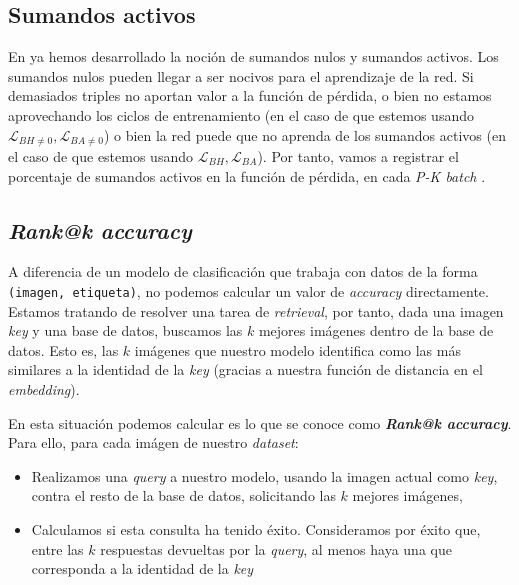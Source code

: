 \subsection{Sumandos activos}

En  ya hemos desarrollado la noción de sumandos nulos y sumandos activos. Los sumandos nulos pueden llegar a ser nocivos para el aprendizaje de la red. Si demasiados triples no aportan valor a la función de pérdida, o bien no estamos aprovechando los ciclos de entrenamiento (en el caso de que estemos usando $\mathcal{L}_{BH \neq 0}, \mathcal{L}_{BA \neq 0}$) o bien  la red puede que no aprenda de los sumandos activos (en el caso de que estemos usando $\mathcal{L}_{BH}, \mathcal{L}_{BA}$). Por tanto, vamos a registrar el porcentaje de sumandos activos en la función de pérdida, en cada \textit{P-K batch} \footnotemark.


\subsection{\textit{Rank@k accuracy}} \label{isubs:rank_at_k}

A diferencia de un modelo de clasificación que trabaja con datos de la forma \lstinline{(imagen, etiqueta)}, no podemos calcular un valor de \textit{accuracy} directamente. Estamos tratando de resolver una tarea de \textit{retrieval}, por tanto, dada una imagen \textit{key} y una base de datos, buscamos las $k$  mejores imágenes dentro de la base de datos. Esto es, las $k$ imágenes que nuestro modelo identifica como las más similares a la identidad de la \textit{key} (gracias a nuestra función de distancia en el \textit{embedding}).

En esta situación podemos calcular es lo que se conoce como \textbf{\textit{Rank@k accuracy}}. Para ello, para cada imágen de nuestro \textit{dataset}:

\begin{itemize}
    \item Realizamos una \textit{query} a nuestro modelo, usando la imagen actual como \textit{key}, contra el resto de la base de datos, solicitando las $k$ mejores imágenes,
    \item Calculamos si esta consulta ha tenido éxito. Consideramos por éxito que, entre las $k$ respuestas devueltas por la \textit{query}, al menos haya una que corresponda a la identidad de la \textit{key}
\end{itemize}

